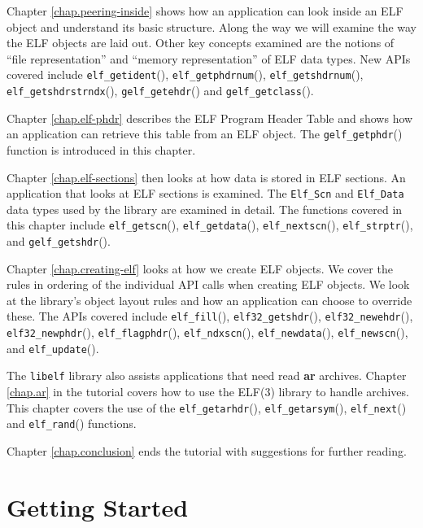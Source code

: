 \documentclass[a4paper]{book}
\newcommand{\function}[1]{\texttt{#1}()}
\newcommand{\library}[1]{\texttt{#1}}
\newcommand{\tool}[1]{\textbf{#1}}
\newcommand{\type}[1]{\texttt{#1}}
\begin{document}
Chapter \vref{chap.peering-inside} shows how an application can look
inside an ELF object and understand its basic structure.  Along the
way we will examine the way the ELF objects are laid out.  Other key
concepts examined are the notions of ``file representation''
 and ``memory representation''
 of ELF data types.  New APIs covered
include \function{elf\_getident}, \function{elf\_getphdrnum},
\function{elf\_getshdrnum}, \function{elf\_getshdrstrndx},
\function{gelf\_getehdr} and \function{gelf\_getclass}.

Chapter \vref{chap.elf-phdr} describes the ELF Prog\-ram Head\-er Table
and shows how an appli\-cation can retrieve this table from an ELF
object.  The \function{gelf\_getphdr} function is introduced in this
chapter.

Chapter \vref{chap.elf-sections} then looks at how data is stored in
ELF sections.  An application that looks at ELF sections is examined.
The \type{Elf\_Scn} and \type{Elf\_Data} data types used by the
library are examined in detail. The functions covered in this chapter
include \function{elf\_getscn}, \function{elf\_getdata},
\function{elf\_nextscn}, \function{elf\_strptr}, and
\function{gelf\_getshdr}.

Chapter \vref{chap.creating-elf} looks at how we create ELF objects.
We cover the rules in ordering of the individual API calls when
creating ELF objects.  We look at the library's object layout rules
and how an application can choose to override these.  The APIs covered
include \function{elf\_fill}, \function{elf32\_getshdr},
\function{elf32\_newehdr}, \function{elf32\_newphdr},
\function{elf\_flagphdr}, \function{elf\_ndxscn},
\function{elf\_newdata}, \function{elf\_newscn}, and
\function{elf\_update}.

The \library{libelf} library also assists applications that need read
\tool{ar} archives.  Chapter \vref{chap.ar} in the tutorial covers how
to use the ELF(3) library to handle archives.  This chapter covers the
use of the \function{elf\_getarhdr}, \function{elf\_getarsym},
\function{elf\_next} and \function{elf\_rand} functions.

Chapter \vref{chap.conclusion} ends the tutorial with suggestions for
further reading.

\chapter{Getting Started}\label{chap.getting-started}
\end{document}
